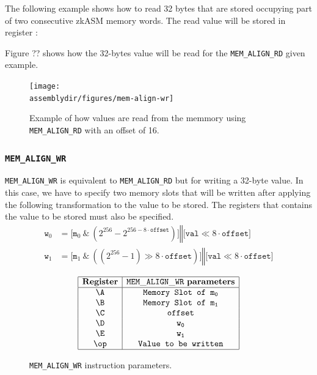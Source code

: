The following example shows how to read 32 bytes that are stored occupying part of two consecutive zkASM memory words. The read value will be stored in register \A:


Figure ?? shows how the 32-bytes value will be read for the \texttt{MEM\_ALIGN\_RD} given example.

\begin{figure}[H]
  \centering
  \texttt{[image: \\assemblydir/figures/mem-align-wr]}
  \caption{Example of how values are read from the memmory using \texttt{MEM\_ALIGN\_RD} with an offset of 16.}
  \label{fig:memory-regions}
\end{figure}

\subsubsection{\texttt{MEM\_ALIGN\_WR}}
\texttt{MEM\_ALIGN\_WR} is equivalent to \texttt{MEM\_ALIGN\_RD} but for writing a 32-byte value. In this case, we have to specify two memory slots that will be written after applying the following transformation to the value to be stored. The registers that contains the value to be stored must also be specified.
\begin{align*}
\texttt{w}_0 &= \Bigr[ \texttt{m}_0 \ \texttt{\&} \ \left(2^{256} - 2^{256-8 \cdot \texttt{offset}} \right) \Bigr] \mathbin\Vert \Bigr[  \texttt{val} \ll 8 \cdot \texttt{offset} \Bigr]  \\
\texttt{w}_1 &= \Bigr[ \texttt{m}_1 \ \texttt{\&} \ \left( \left( 2^{256} - 1\right)  \gg 8 \cdot \texttt{offset}\right) \Bigr] \mathbin\Vert \Bigr[ \texttt{val} \ll 8 \cdot \texttt{offset} \Bigr] 
\end{align*}

\begin{figure}[h!]
\renewcommand{\figurename}{Table}
\[
\begin{array}{|c|c|}
\hline
\mathbf{Register} &\mathtt{MEM\_ALIGN\_WR} \ \mathbf{parameters} \\ \hline
\A & \texttt{Memory Slot of } \mathtt{m_0}  \\
\B & \texttt{Memory Slot of } \mathtt{m_1}  \\
\C & \mathtt{offset} \\
\D & \mathtt{w_0} \\
\E & \mathtt{w_1} \\
\op& \texttt{Value to be written} \\
\hline
\end{array}
\]
\caption{\texttt{MEM\_ALIGN\_WR} instruction parameters.}
\label{tab:memory-first-example}
\end{figure}


